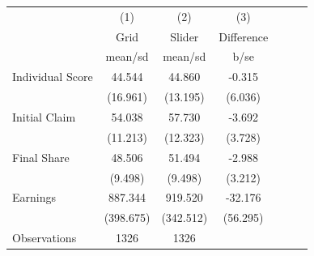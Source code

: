 {
\def\sym#1{\ifmmode^{#1}\else\(^{#1}\)\fi}
\begin{tabular}{l*{3}{cc}}
\hline\hline
                    &\multicolumn{1}{c}{(1)}&\multicolumn{1}{c}{(2)}&\multicolumn{1}{c}{(3)}\\
                    &\multicolumn{1}{c}{Grid}&\multicolumn{1}{c}{Slider}&\multicolumn{1}{c}{Difference}\\
                    &     mean/sd&     mean/sd&        b/se   \\
\hline
Individual Score    &      44.544&      44.860&      -0.315   \\
                    &    (16.961)&    (13.195)&     (6.036)   \\
Initial Claim       &      54.038&      57.730&      -3.692   \\
                    &    (11.213)&    (12.323)&     (3.728)   \\
Final Share         &      48.506&      51.494&      -2.988   \\
                    &     (9.498)&     (9.498)&     (3.212)   \\
Earnings            &     887.344&     919.520&     -32.176   \\
                    &   (398.675)&   (342.512)&    (56.295)   \\
\hline
Observations        &        1326&        1326&               \\
\hline\hline
\end{tabular}
}
